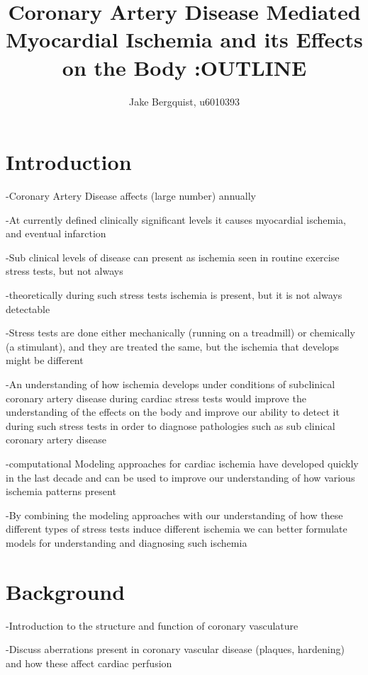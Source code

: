 \documentclass[12pt]{article}
\begin{document}
\title{Coronary Artery Disease Mediated Myocardial Ischemia and its Effects on the Body :OUTLINE }

\author{Jake Bergquist, u6010393}
\maketitle

\section{Introduction}

-Coronary Artery Disease affects (large number) annually

-At currently defined clinically significant levels it causes myocardial ischemia, and eventual infarction

-Sub clinical levels of disease can present as ischemia seen in routine exercise stress tests, but not always

-theoretically during such stress tests ischemia is present, but it is not always detectable

-Stress tests are done either mechanically (running on a treadmill) or chemically (a stimulant), and they are treated the same, but the ischemia that develops might be different

-An understanding of how ischemia develops under conditions of subclinical coronary artery disease during cardiac stress tests would improve the understanding of the effects on the body and improve our ability to detect it during such stress tests in order to diagnose pathologies such as sub clinical coronary artery disease

-computational Modeling approaches for cardiac ischemia have developed quickly in the last decade and can be used to improve our understanding of how various ischemia patterns present

-By combining the modeling approaches with our understanding of how these different types of stress tests induce different ischemia we can better formulate models for understanding and diagnosing such ischemia

\section{Background}

-Introduction to the structure and function of coronary vasculature

-Discuss aberrations present in coronary vascular disease (plaques, hardening) and how these affect cardiac perfusion 
\end{document}
